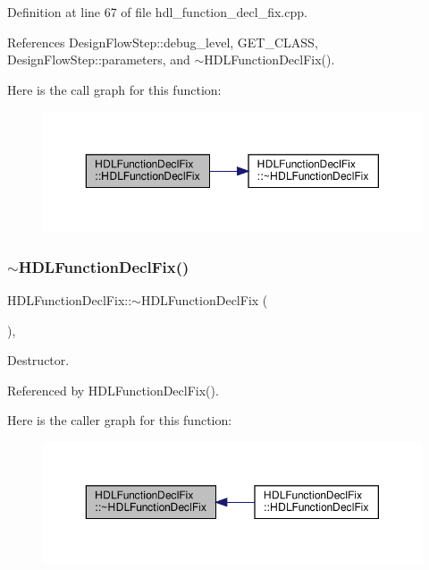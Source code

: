 Definition at line 67 of file hdl\+\_\+function\+\_\+decl\+\_\+fix.\+cpp.



References Design\+Flow\+Step\+::debug\+\_\+level, G\+E\+T\+\_\+\+C\+L\+A\+SS, Design\+Flow\+Step\+::parameters, and $\sim$\+H\+D\+L\+Function\+Decl\+Fix().

Here is the call graph for this function\+:
\nopagebreak
\begin{figure}[H]
\begin{center}
\leavevmode
\includegraphics[width=350pt]{dc/d52/classHDLFunctionDeclFix_a4f766168161e512af7835f42d6d3374c_cgraph}
\end{center}
\end{figure}
\mbox{\label{classHDLFunctionDeclFix_a5fecf6542050fa10da6b8830fcd749ba}} 
\subsubsection{\texorpdfstring{$\sim$\+H\+D\+L\+Function\+Decl\+Fix()}{~HDLFunctionDeclFix()}}
{\footnotesize\ttfamily H\+D\+L\+Function\+Decl\+Fix\+::$\sim$\+H\+D\+L\+Function\+Decl\+Fix (\begin{DoxyParamCaption}{ }\end{DoxyParamCaption})\hspace{0.3cm}{\ttfamily [override]}, {\ttfamily [default]}}



Destructor. 



Referenced by H\+D\+L\+Function\+Decl\+Fix().

Here is the caller graph for this function\+:
\nopagebreak
\begin{figure}[H]
\begin{center}
\leavevmode
\includegraphics[width=350pt]{dc/d52/classHDLFunctionDeclFix_a5fecf6542050fa10da6b8830fcd749ba_icgraph}
\end{center}
\end{figure}


